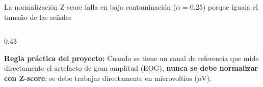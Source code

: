 \documentclass[aspectratio=169,9pt]{beamer}
\begin{document}
\begin{frame}{La normalizaci\'on Z-score falla en baja contaminaci\'on ($\alpha = 0.25$) porque iguala el tama\~no de las se\~nales}
\begin{columns}[T,onlytextwidth]
\begin{column}{0.43\textwidth}
      \vspace{0.06cm}

      \begin{tcolorbox}[tealcard]
        \tiny
        \textbf{Regla pr\'actica del proyecto:} Cuando se tiene un canal de referencia que mide directamente el artefacto de gran amplitud (EOG), \textbf{nunca se debe normalizar con Z-score}; se debe trabajar directamente en microvoltios ($\mu\text{V}$).
      \end{tcolorbox}
    \end{column}
  \end{columns}
\end{frame}

\end{document}
